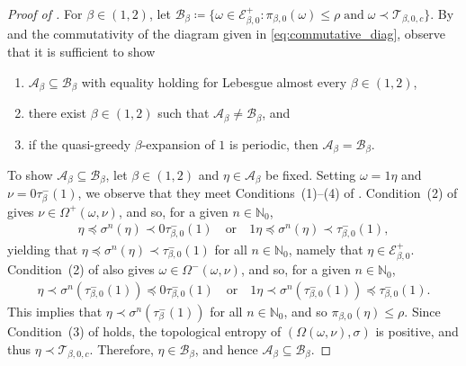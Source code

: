 \documentclass[a4paper,reqno,10pt]{amsart}
\begin{document}
\begin{proof}[Proof of \texorpdfstring{}{Theorem 1.1}]
For $\beta\in(1,2)$, let $\mathcal{B}_{\beta} \coloneqq \{ \omega \in \mathcal{E}_{\beta,0}^{+} \colon \pi_{\beta,0}(\omega) \leq \rho \; \text{and} \; \omega \prec \mathcal{T}_{\beta, 0, c}\}$.  By  and the commutativity of the diagram given in \eqref{eq:commutative_diag}, observe that it is sufficient to show 
    \begin{enumerate}
        \item $\mathcal{A}_\beta\subseteq \mathcal{B}_\beta$ with equality holding for Lebesgue almost every $\beta\in(1,2)$, 
        \item there exist $\beta\in (1,2)$ such that $\mathcal{A}_\beta \neq \mathcal{B}_\beta$, and
        \item  if the quasi-greedy $\beta$-expansion of $1$ is periodic, then $\mathcal{A}_\beta = \mathcal{B}_\beta$.
    \end{enumerate}    
To show $\mathcal{A}_\beta\subseteq \mathcal{B}_\beta$, let $\beta \in (1, 2)$ and $\eta \in \mathcal{A}_\beta$ be fixed.  Setting $\omega = 1\eta$ and $\nu = 0\tau_\beta^-(1)$, we observe that they meet Conditions~(1)--(4) of  . Condition~(2) of  gives $\nu \in \Omega^{+}(\omega, \nu)$, and so, for a given $n \in \mathbb{N}_{0}$,
    \begin{align*}
        \eta \preceq \sigma^{n}(\eta) \prec 0 \tau_{\beta,0}^{-}(1) \quad \text{or} \quad 1\eta \preceq \sigma^{n}(\eta) \prec \tau_{\beta,0}^{-}(1),
    \end{align*}
yielding that $\eta \preceq \sigma^{n}(\eta) \prec \tau_{\beta,0}^{-}(1)$ for all $n \in \mathbb{N}_{0}$, namely that $\eta \in \mathcal{E}_{\beta,0}^{+}$. Condition~(2) of  also gives $\omega\in \Omega^{-}(\omega, \nu)$, and so, for a given $n \in \mathbb{N}_{0}$,
    \begin{align*}
        \eta \prec \sigma^{n}(\tau_{\beta,0}^{-}(1)) \preceq 0 \tau_{\beta,0}^{-}(1) \quad \text{or} \quad 1\eta \prec \sigma^{n}(\tau_{\beta,0}^{-}(1)) \preceq \tau_{\beta,0}^{-}(1).
    \end{align*}
This implies that $\eta \prec \sigma^{n}(\tau_\beta^-(1))$ for all $n \in \mathbb{N}_{0}$, and so $\pi_{\beta,0}(\eta)\leq \rho$. Since Condition~(3) of  holds, the topological entropy of $(\Omega(\omega,\nu), \sigma)$ is positive, and thus $\eta \prec \mathcal{T}_{\beta, 0, c}$. Therefore, $\eta \in \mathcal{B}_\beta$, and hence $\mathcal{A}_\beta\subseteq \mathcal{B}_\beta$. 


\end{proof}
\end{document}
